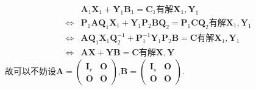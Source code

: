 \documentclass[../../main.tex]{subfiles}%
\begin{document}
\begin{note}
\begin{align*}
&\boldsymbol{A}_1\boldsymbol{X}_1+\boldsymbol{Y}_1\boldsymbol{B}_1=\boldsymbol{C}_1\text{有解}\boldsymbol{X}_1,\boldsymbol{Y}_1\\
\Leftrightarrow&\boldsymbol{P}_1\boldsymbol{AQ}_1\boldsymbol{X}_1+\boldsymbol{Y}_1\boldsymbol{P}_2\boldsymbol{BQ}_2=\boldsymbol{P}_1\boldsymbol{CQ}_2\text{有解}\boldsymbol{X}_1,\boldsymbol{Y}_1\\
\Leftrightarrow&\boldsymbol{AQ}_1\boldsymbol{X}_1\boldsymbol{Q}_{2}^{-1}+\boldsymbol{P}_{1}^{-1}\boldsymbol{Y}_1\boldsymbol{P}_2\boldsymbol{B}=\boldsymbol{C}\text{有解}\boldsymbol{X}_1,\boldsymbol{Y}_1\\
\Leftrightarrow&\boldsymbol{AX}+\boldsymbol{YB}=\boldsymbol{C}\text{有解}\boldsymbol{X},\boldsymbol{Y}
\end{align*}
故可以不妨设\(\boldsymbol{A}=\begin{pmatrix}
\boldsymbol{I}_r & \boldsymbol{O} \\
\boldsymbol{O} & \boldsymbol{O}
\end{pmatrix}\),\(\boldsymbol{B}=\begin{pmatrix}
\boldsymbol{I}_s & \boldsymbol{O} \\
\boldsymbol{O} & \boldsymbol{O}
\end{pmatrix}\).
\end{note}
\end{document}
